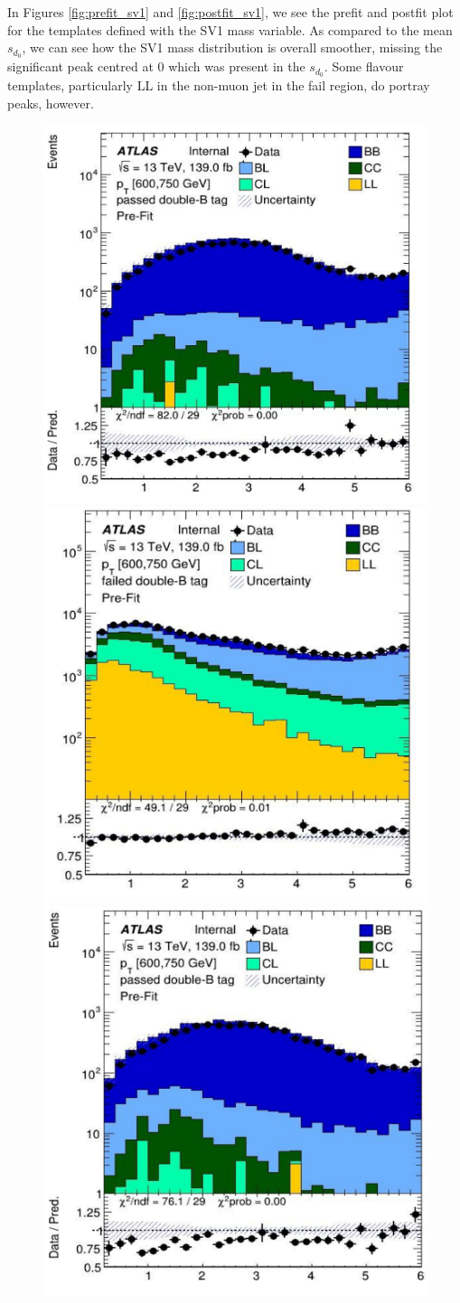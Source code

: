 \documentclass[10pt,a4paper]{book}
\begin{document}
In Figures \ref{fig:prefit_sv1} and \ref{fig:postfit_sv1}, we see the prefit and postfit plot for the templates defined with the SV1 mass variable. As compared to the mean $s_{d_0}$, we can see how the SV1 mass distribution is overall smoother, missing the significant peak centred at 0 which was present in the $s_{d_0}$. Some flavour templates, particularly LL in the non-muon jet in the fail region, do portray peaks, however.

\begin{figure}
    \centering
    \includegraphics[width=0.485\linewidth]{ftag/sv1Fit/prefit/muon_pass.png}
    \includegraphics[width=0.485\linewidth]{ftag/sv1Fit/prefit/muon_fail.png} \\
     \includegraphics[width=0.485\linewidth]{ftag/sv1Fit/prefit/nonmuon_pass.png}

\end{figure}
\end{document}
